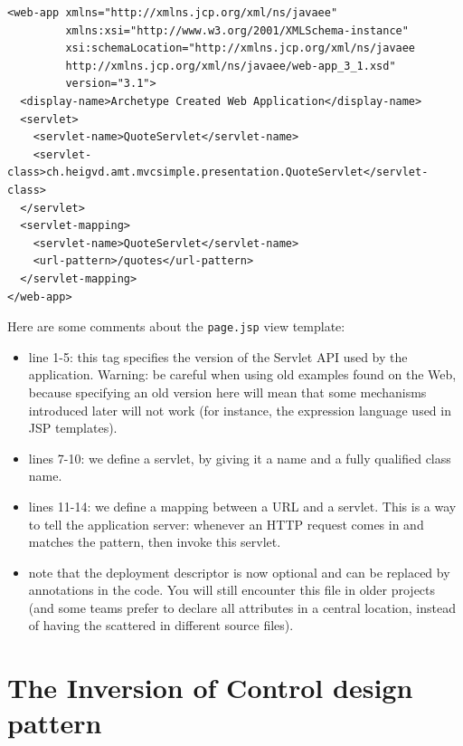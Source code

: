 \vspace{10pt}
\begin{minipage}{\linewidth}
\begin{lstlisting}[frame=single]
<web-app xmlns="http://xmlns.jcp.org/xml/ns/javaee"
         xmlns:xsi="http://www.w3.org/2001/XMLSchema-instance"
         xsi:schemaLocation="http://xmlns.jcp.org/xml/ns/javaee
		 http://xmlns.jcp.org/xml/ns/javaee/web-app_3_1.xsd"
         version="3.1">
  <display-name>Archetype Created Web Application</display-name>
  <servlet>
    <servlet-name>QuoteServlet</servlet-name>
    <servlet-class>ch.heigvd.amt.mvcsimple.presentation.QuoteServlet</servlet-class>
  </servlet>
  <servlet-mapping>
    <servlet-name>QuoteServlet</servlet-name>
    <url-pattern>/quotes</url-pattern>
  </servlet-mapping>
</web-app>
\end{lstlisting}
\end{minipage}

Here are some comments about the \texttt{page.jsp} view template:

\begin{itemize}
\item line 1-5: this tag specifies the version of the Servlet API used by the application. Warning: be careful when using old examples found on the Web, because specifying an old version here will mean that some mechanisms introduced later will not work (for instance, the expression language used in \ac{JSP} templates).
\item lines 7-10: we define a servlet, by giving it a name and a fully qualified class name.
\item lines 11-14: we define a mapping between a URL and a servlet. This is a way to tell the application server: whenever an HTTP request comes in and matches the pattern, then invoke this servlet.
\item note that the deployment descriptor is now optional and can be replaced by annotations in the code. You will still encounter this file in older projects (and some teams prefer to declare all attributes in a central location, instead of having the scattered in different source files). 
\end{itemize}

\section{The Inversion of Control design pattern}

